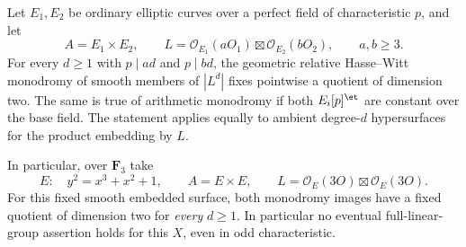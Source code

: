 \begin{proposition}\label{prop:product-surface-norm-obstruction}
Let $E_1,E_2$ be ordinary elliptic curves over a perfect
field of characteristic $p$, and let
\[
 A=E_1\times E_2,\qquad
 L=\mathcal O_{E_1}(aO_1)\boxtimes\mathcal O_{E_2}(bO_2),
       \qquad a,b\geq3.
\]
For every $d\geq1$ with $p\mid ad$ and $p\mid bd$, the
geometric relative Hasse--Witt monodromy of smooth members
of $|L^d|$ fixes pointwise a quotient of dimension two.
The same is true of arithmetic monodromy if both
$E_i[p]^{\et}$ are constant over the base field.
The statement applies equally to ambient degree-$d$
hypersurfaces for the product embedding by $L$.

In particular, over $\mathbf F_3$ take
\begin{equation}\label{eq:odd-product-explicit-elliptic}
 E:\quad y^2=x^3+x^2+1,
 \qquad A=E\times E,\qquad
 L=\mathcal O_E(3O)\boxtimes\mathcal O_E(3O).
\end{equation}
For this fixed smooth embedded surface, both monodromy
images have a fixed quotient of dimension two for
\emph{every} $d\geq1$.  In particular no eventual
full-linear-group assertion holds for this $X$, even
in odd characteristic.
\end{proposition}

